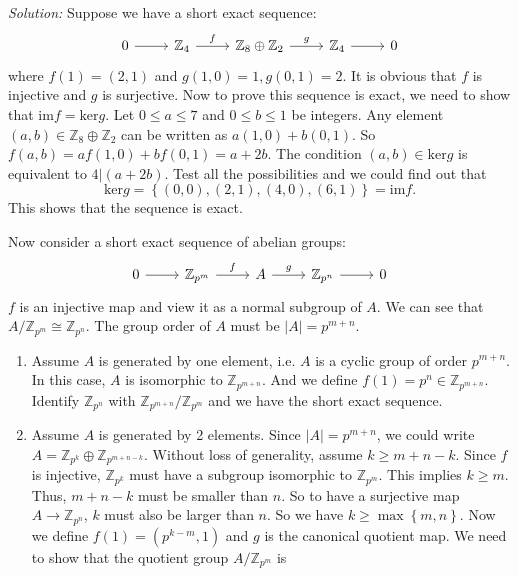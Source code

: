 \documentclass[a4paper, 11pt]{article}
\newenvironment{solution}
    {\textit{Solution:}}
    {}
\begin{document}
\begin{solution}
Suppose we have a short exact sequence:
$$\begin{tikzcd}
	0 & {\mathbb{Z}_4} & {\mathbb{Z}_8\oplus\mathbb{Z}_2} & {\mathbb{Z}_4} & 0
	\arrow[from=1-1, to=1-2]
	\arrow["f", from=1-2, to=1-3]
	\arrow["g", from=1-3, to=1-4]
	\arrow[from=1-4, to=1-5]
\end{tikzcd}$$
where \(f(1)=(2,1)\) and \(g(1,0)=1,g(0,1)=2\). It is obvious that \(f\) is injective and \(g\) is surjective. Now to prove this sequence is exact, we need to show that \(\text{im}f=\text{ker}g\). 
Let \(0\leq a\leq 7\) and \(0\leq b\leq 1\) be integers. Any element \((a,b)\in \mathbb{Z}_8\oplus \mathbb{Z}_2\) can be written as \(a(1,0)+b(0,1)\). So \(f(a,b)=af(1,0)+bf(0,1)=a+2b\). The condition 
\((a,b)\in \text{ker}g\) is equivalent to \(4|(a+2b)\). Test all the possibilities and we could find out that 
$$\text{ker}g=\left\{ (0,0),(2,1),(4,0),(6,1) \right\}=\text{im}f.$$
This shows that the sequence is exact.
\par 
Now consider a short exact sequence of abelian groups:
$$\begin{tikzcd}
	0 & {\mathbb{Z}_{p^m}} & A & {\mathbb{Z}_{p^n}} & 0
	\arrow[from=1-1, to=1-2]
	\arrow["f",from=1-2, to=1-3]
	\arrow["g",from=1-3, to=1-4]
	\arrow[from=1-4, to=1-5]
\end{tikzcd}$$
\(f\) is an injective map and view it as a normal subgroup of \(A\). We can see that \(A/\mathbb{Z}_{p^m}\cong \mathbb{Z}_{p^n}\). The group order of \(A\) must be \(|A|=p^{m+n}\).
\\ 
\begin{enumerate}
    \item Assume \(A\) is generated by one element, i.e. \(A\) is a cyclic group of order \(p^{m+n}\). In this case, \(A\) is isomorphic to \(\mathbb{Z}_{p^{m+n}}\). And we define 
          \(f(1)=p^n\in \mathbb{Z}_{p^{m+n}}\). Identify \(\mathbb{Z}_{p^n}\) with \(\mathbb{Z}_{p^{m+n}}/\mathbb{Z}_{p^m}\) and we have the short exact sequence. 
    \item Assume \(A\) is generated by 2 elements. Since \(|A|=p^{m+n}\), we could write \(A=\mathbb{Z}_{p^k}\oplus \mathbb{Z}_{p^{m+n-k}}\). Without loss of generality, assume \(k\geq m+n-k\). Since \(f\) is injective, 
          \(\mathbb{Z}_{p^k}\) must have a subgroup isomorphic to \(\mathbb{Z}_{p^m}\). This implies \(k\geq m\). Thus, \(m+n-k\) must be smaller than \(n\). So to have a surjective map \(A\rightarrow \mathbb{Z}_{p^n}\), \(k\) 
          must also be larger than \(n\). So we have \(k\geq \max\left\{ m,n \right\}\). Now we define \(f(1)=(p^{k-m},1)\) and \(g\) is the canonical quotient map. We need to show that the quotient group \(A/\mathbb{Z}_{p^m}\) is 

\end{enumerate}
\end{solution}
\end{document}
